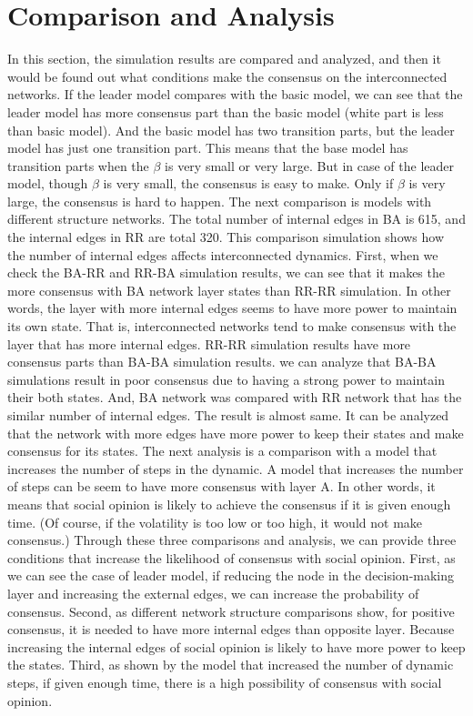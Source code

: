 \documentclass[english]{cccconf}
\begin{document}
\section{Comparison and Analysis}
In this section, the simulation results are compared and analyzed, and then it would be found out what conditions make the consensus on the interconnected networks.
If the leader model compares with the basic model, we can see that the leader model has more consensus part than the basic model (white part is less than basic model). And the basic model has two transition parts, but the leader model has just one transition part. This means that the base model has transition parts when the $\beta$ is very small or very large. But in case of the leader model, though $\beta$ is very small, the consensus is easy to make. Only if $\beta$ is very large, the consensus is hard to happen.
The next comparison is models with different structure networks. The total number of internal edges in BA is 615, and the internal edges in RR are total 320. This comparison simulation shows how the number of internal edges affects interconnected dynamics. First, when we check the BA-RR and RR-BA simulation results, we can see that it makes the more consensus with BA network layer states than RR-RR simulation.  In other words, the layer with more internal edges seems to have more power to maintain its own state. That is, interconnected networks tend to make consensus with the layer that has more internal edges. RR-RR simulation results have more consensus parts than BA-BA simulation results. we can analyze that BA-BA simulations result in poor consensus due to having a strong power to maintain their both states. And, BA network was compared with RR network that has the similar number of internal edges. The result is almost same. It can be analyzed that the network with more edges have more power to keep their states and make consensus for its states.
The next analysis is a comparison with a model that increases the number of steps in the dynamic. A model that increases the number of steps can be seem to have more consensus with layer A. In other words, it means that social opinion is likely to achieve the consensus if it is given enough time. (Of course, if the volatility is too low or too high, it would not make consensus.)
Through these three comparisons and analysis, we can provide three conditions that increase the likelihood of consensus with social opinion. First, as we can see the case of leader model, if reducing the node in the decision-making layer and increasing the external edges, we can increase the probability of consensus. Second, as different network structure comparisons show, for positive consensus, it is needed to have more internal edges than opposite layer. Because increasing the internal edges of social opinion is likely to have more power to keep the states. Third, as shown by the model that increased the number of dynamic steps, if given enough time, there is a high possibility of consensus with social opinion.
\end{document}
